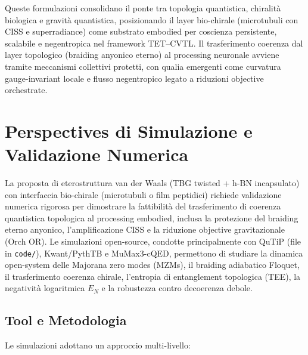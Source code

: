 \documentclass[11pt,a4paper]{article}
\theoremstyle{plain}
\theoremstyle{definition}
\begin{document}
Queste formulazioni consolidano il ponte tra topologia quantistica, chiralità biologica e gravità quantistica, posizionando il layer bio-chirale (microtubuli con CISS e superradiance) come substrato embodied per coscienza persistente, scalabile e negentropica nel framework TET--CVTL. Il trasferimento coerenza dal layer topologico (braiding anyonico eterno) al processing neuronale avviene tramite meccanismi collettivi protetti, con qualia emergenti come curvatura gauge-invariant locale e flusso negentropico legato a riduzioni objective orchestrate.









\vspace{0.4cm}




\section{Perspectives di Simulazione e Validazione Numerica}

La proposta di eterostruttura van der Waals (TBG twisted + h-BN incapsulato) con interfaccia bio-chirale (microtubuli o film peptidici) richiede validazione numerica rigorosa per dimostrare la fattibilità del trasferimento di coerenza quantistica topologica al processing embodied, inclusa la protezione del braiding eterno anyonico, l'amplificazione CISS e la riduzione objective gravitazionale (Orch OR). Le simulazioni open-source, condotte principalmente con QuTiP (file in \texttt{code/}), Kwant/PythTB e MuMax3-cQED, permettono di studiare la dinamica open-system delle Majorana zero modes (MZMs), il braiding adiabatico Floquet, il trasferimento coerenza chirale, l'entropia di entanglement topologica (TEE), la negatività logaritmica $E_N$ e la robustezza contro decoerenza debole.

\vspace{0.4cm}

\subsection{Tool e Metodologia}

Le simulazioni adottano un approccio multi-livello:
\end{document}
